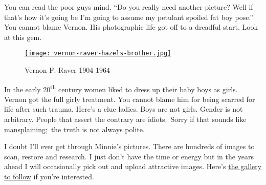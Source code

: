 You can read the poor guys mind. ``Do you really need another picture?
Well if that's how it's going be I'm going to assume my petulant spoiled
fat boy pose.'' You cannot blame Vernon. His photographic life got off
to a dreadful start. Look at this gem.



\begin{SCfigure}
\centering
\href{http://conceptcontrol.smugmug.com/People/Minnie-Raver/i-pms8BTb/A}{\texttt{[image: vernon-raver-hazels-brother.jpg]}}
\caption{Vernon F. Raver 1904-1964}
\label{fig:4230X5}
\end{SCfigure}


In the early 20\textsuperscript{th} century women liked to dress up
their baby boys as girls. Vernon got the full girly treatment. You
cannot blame him for being scarred for life after such trauma. Here's a
clue ladies. Boys are not girls. Gender is not arbitrary. People that
assert the contrary are idiots.~Sorry if that sounds like
\href{http://www.policymic.com/articles/44479/mansplaining-101-how-to-discuss-politics-and-feminism-without-acting-like-a-jackass}{mansplaining};~the
truth is not always polite.

I doubt I'll ever get through Minnie's pictures. There are hundreds of
images to scan, restore and research. I just don't have the time or
energy but in the years ahead I will occasionally pick out and upload
attractive images. Here's
\href{http://conceptcontrol.smugmug.com/People/Minnie-Raver}{the gallery
to follow} if you're interested.

%

